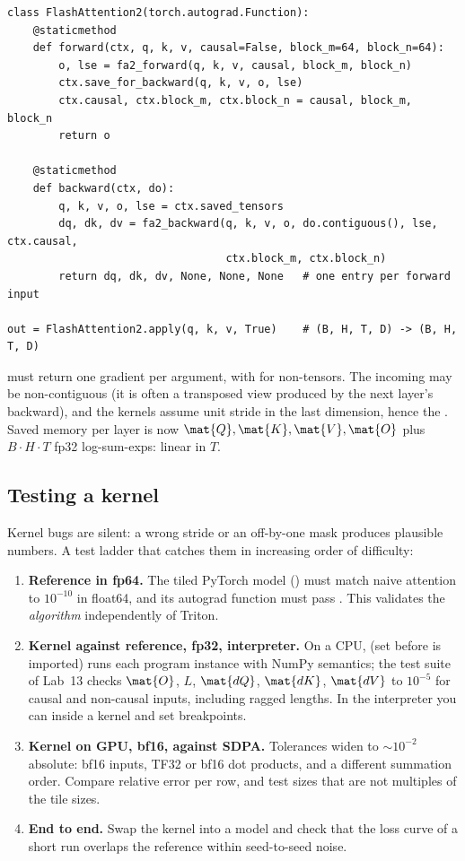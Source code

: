 \begin{lstlisting}[caption={The autograd function: save $(\mat{Q},\mat{K},\mat{V},\mat{O},L)$, never $\mat{P}$.},label={lst:perf:fa2fn}]
class FlashAttention2(torch.autograd.Function):
    @staticmethod
    def forward(ctx, q, k, v, causal=False, block_m=64, block_n=64):
        o, lse = fa2_forward(q, k, v, causal, block_m, block_n)
        ctx.save_for_backward(q, k, v, o, lse)
        ctx.causal, ctx.block_m, ctx.block_n = causal, block_m, block_n
        return o

    @staticmethod
    def backward(ctx, do):
        q, k, v, o, lse = ctx.saved_tensors
        dq, dk, dv = fa2_backward(q, k, v, o, do.contiguous(), lse, ctx.causal,
                                  ctx.block_m, ctx.block_n)
        return dq, dk, dv, None, None, None   # one entry per forward input

out = FlashAttention2.apply(q, k, v, True)    # (B, H, T, D) -> (B, H, T, D)
\end{lstlisting}

 must return one gradient per  argument, with  for
non-tensors. The incoming  may be non-contiguous (it is often a transposed view produced by
the next layer's backward), and the kernels assume unit stride in the last dimension, hence the
. Saved memory per layer is now $\mat{Q},\mat{K},\mat{V},\mat{O}$ plus $B\cdot H\cdot T$
fp32 log-sum-exps: linear in $T$.

\subsection{Testing a kernel}

Kernel bugs are silent: a wrong stride or an off-by-one mask produces plausible numbers. A test
ladder that catches them in increasing order of difficulty:
\begin{enumerate}
\item \textbf{Reference in fp64.} The tiled PyTorch model () must match naive
  attention to $10^{-10}$ in float64, and its autograd function must pass
  . This validates the \emph{algorithm} independently of Triton.
\item \textbf{Kernel against reference, fp32, interpreter.} On a CPU, 
  (set before  is imported) runs each program instance with NumPy semantics; the test
  suite of Lab~13 checks $\mat{O}$, $L$, $\mat{dQ}$, $\mat{dK}$, $\mat{dV}$ to $10^{-5}$ for causal and
  non-causal inputs, including ragged lengths. In the interpreter you can  inside a
  kernel and set breakpoints.
\item \textbf{Kernel on GPU, bf16, against SDPA.} Tolerances widen to $\sim10^{-2}$ absolute: bf16
  inputs, TF32 or bf16 dot products, and a different summation order. Compare relative error per
  row, and test sizes that are not multiples of the tile sizes.
\item \textbf{End to end.} Swap the kernel into a model and check that the loss curve of a short
  run overlaps the reference within seed-to-seed noise.
\end{enumerate}

